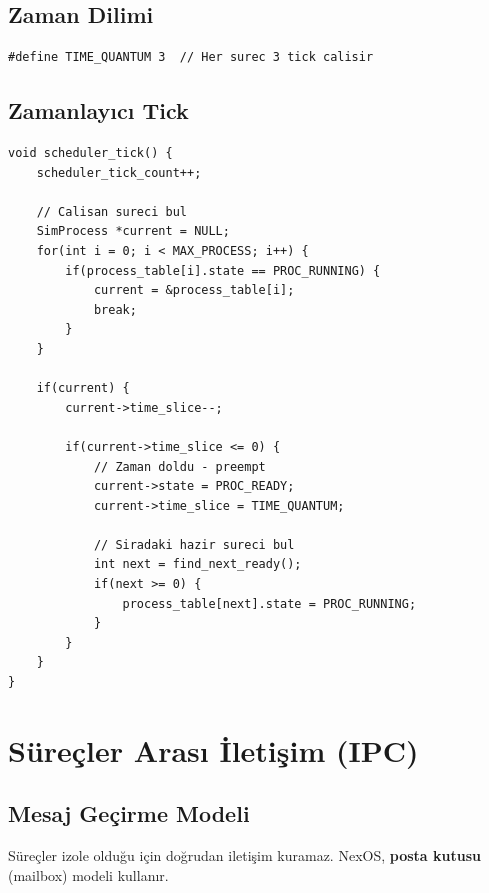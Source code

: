 \documentclass[12pt,a4paper]{report}
\begin{document}
\section{Zaman Dilimi}

\begin{lstlisting}[caption={Zaman Dilimi Tanimi}]
#define TIME_QUANTUM 3  // Her surec 3 tick calisir
\end{lstlisting}

\section{Zamanlayıcı Tick}

\begin{lstlisting}[caption={scheduler\_tick Fonksiyonu}]
void scheduler_tick() {
    scheduler_tick_count++;
    
    // Calisan sureci bul
    SimProcess *current = NULL;
    for(int i = 0; i < MAX_PROCESS; i++) {
        if(process_table[i].state == PROC_RUNNING) {
            current = &process_table[i];
            break;
        }
    }
    
    if(current) {
        current->time_slice--;
        
        if(current->time_slice <= 0) {
            // Zaman doldu - preempt
            current->state = PROC_READY;
            current->time_slice = TIME_QUANTUM;
            
            // Siradaki hazir sureci bul
            int next = find_next_ready();
            if(next >= 0) {
                process_table[next].state = PROC_RUNNING;
            }
        }
    }
}
\end{lstlisting}

\chapter{Süreçler Arası İletişim (IPC)}

\section{Mesaj Geçirme Modeli}

Süreçler izole olduğu için doğrudan iletişim kuramaz. NexOS, \textbf{posta kutusu} (mailbox) modeli kullanır.
\end{document}
